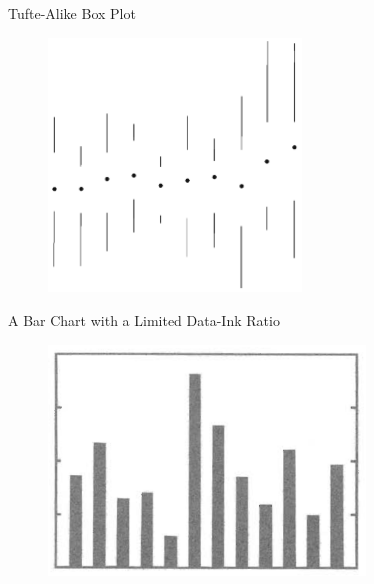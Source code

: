 \documentclass[notes, aspectratio=1610]{beamer}
\begin{document}
\begin{frame}{Tufte-Alike Box Plot}{}
\begin{figure}
		\begin{center}
			\includegraphics[width=0.6\textwidth]{images/tufte_boxplot.png}
		\end{center}
	\end{figure}

\end{frame}

\begin{frame}{A Bar Chart with a Limited Data-Ink Ratio}{}
\begin{figure}
		\begin{center}
			\includegraphics[width=0.75\textwidth]{images/trad_barchart.png}
		\end{center}
	\end{figure}

\end{frame}
\end{document}
